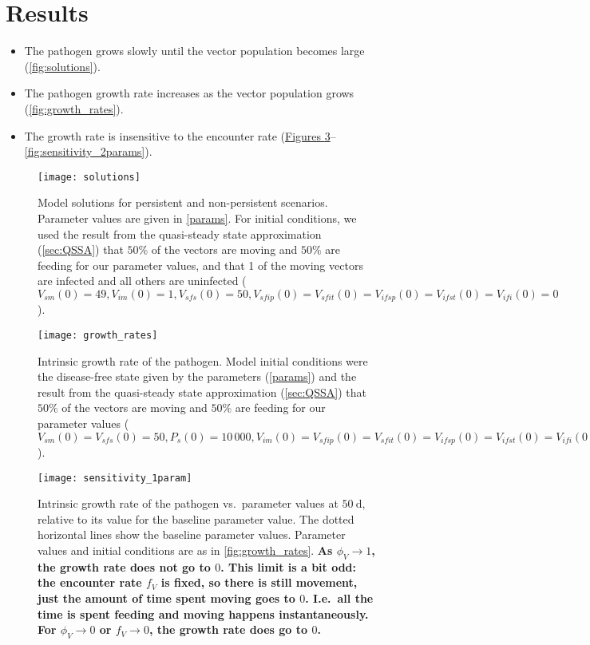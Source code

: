 \documentclass{article}
\newcommand{\comment}[1]{\textbf{#1}}
\begin{document}
\section{Results}

\begin{itemize}
\item The pathogen grows slowly until the vector population becomes
  large (\autoref{fig:solutions}).

\item The pathogen growth rate increases as the vector population
  grows (\autoref{fig:growth_rates}).

\item The growth rate is insensitive to the encounter rate
  (\hyperref[fig:sensitivity_1param]{Figures
    \ref*{fig:sensitivity_1param}}--\ref{fig:sensitivity_2params}).
\end{itemize}


\begin{figure}
  \centering
  \texttt{[image: solutions]}
  \caption{Model solutions for persistent and non-persistent
    scenarios.  Parameter values are given in \autoref{params}.
    For initial conditions, we used the result from the quasi-steady
    state approximation (\autoref{sec:QSSA}) that $50\%$ of the
    vectors are moving and $50\%$ are feeding for our parameter
    values, and that 1 of the moving vectors are infected and all
    others are uninfected ($V_{sm}(0) = 49, V_{im}(0) = 1, V_{sfs}(0) =
    50, V_{sfip}(0) = V_{sfit}(0) = V_{ifsp}(0) = V_{ifst}(0) =
    V_{ifi}(0) = 0$).}
  \label{fig:solutions}
\end{figure}

\begin{figure}
  \centering
  \texttt{[image: growth\_rates]}
  \caption{Intrinsic growth rate of the pathogen.  Model initial
    conditions were the disease-free state given by the parameters
    (\autoref{params}) and the result from the quasi-steady state
    approximation (\autoref{sec:QSSA}) that $50\%$ of the vectors are
    moving and $50\%$ are feeding for our parameter values ($V_{sm}(0)
    = V_{sfs}(0) = 50, P_s(0) = 10\,000, V_{im}(0) = V_{sfip}(0) =
    V_{sfit}(0) = V_{ifsp}(0) = V_{ifst}(0) = V_{ifi}(0) = P_i(0) =
    0$).}
  \label{fig:growth_rates}
\end{figure}

\begin{figure}
  \centering
  \texttt{[image: sensitivity\_1param]}
  \caption{Intrinsic growth rate of the pathogen vs.~parameter values
    at $50~\text{d}$, relative to its value for the baseline
    parameter value.  The dotted horizontal lines show the baseline
    parameter values.  Parameter values and initial conditions are as
    in \autoref{fig:growth_rates}.  \comment{As $\phi_V \to 1$, the
      growth rate does not go to $0$.  This limit is a bit odd: the
      encounter rate $f_V$ is fixed, so there is still movement, just
      the amount of time spent moving goes to $0$.  I.e.~all the time
      is spent feeding and moving happens instantaneously.  For
      $\phi_V \to 0$ or $f_V \to 0$, the growth rate does go to $0$.}}
  \label{fig:sensitivity_1param}
\end{figure}
\end{document}
